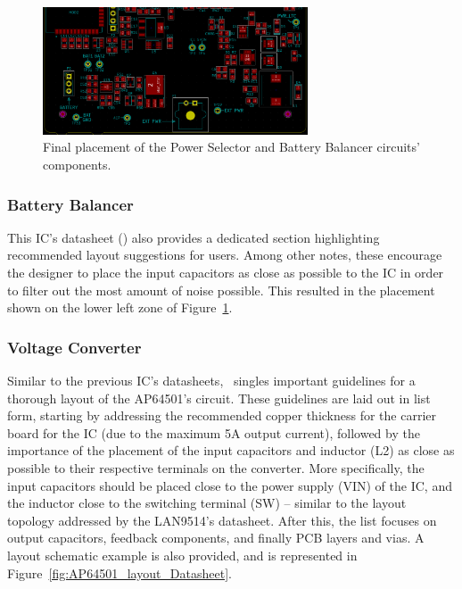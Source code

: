 \begin{figure}[h]
	\centering
	\includegraphics[width=0.7\textwidth]{Chapters/Figures/chapter5/placement_Power_Selector_and_BQ29209.png}
	\caption{Final placement of the Power Selector and Battery Balancer circuits' components.}
	\label{fig:placement_Power_Selector_and_BQ29209}
\end{figure}%


\subsubsection{Battery Balancer}\label{sec:5113_BQ29209}

This IC's datasheet (\cite{bq29209}) also provides a dedicated section highlighting recommended layout suggestions for users. Among other notes, these encourage the designer to place the input capacitors as close as possible to the IC in order to filter out the most amount of noise possible. This resulted in the placement shown on the lower left zone of Figure~\ref{fig:placement_Power_Selector_and_BQ29209}.


\subsubsection{Voltage Converter}\label{sec:5114_VoltageConverter}

Similar to the previous IC's datasheets,~\cite{AP64501} singles important guidelines for a thorough layout of the AP64501's circuit. These guidelines are laid out in list form, starting by addressing the recommended copper thickness for the carrier board for the IC (due to the maximum 5A output current), followed by the importance of the placement of the input capacitors and inductor (L2) as close as possible to their respective terminals on the converter. More specifically, the input capacitors should be placed close to the power supply (VIN) of the IC, and the inductor close to the switching terminal (SW) -- similar to the layout topology addressed by the LAN9514's datasheet. After this, the list focuses on output capacitors, feedback components, and finally PCB layers and vias. A layout schematic example is also provided, and is represented in Figure~\ref{fig:AP64501_layout_Datasheet}.

